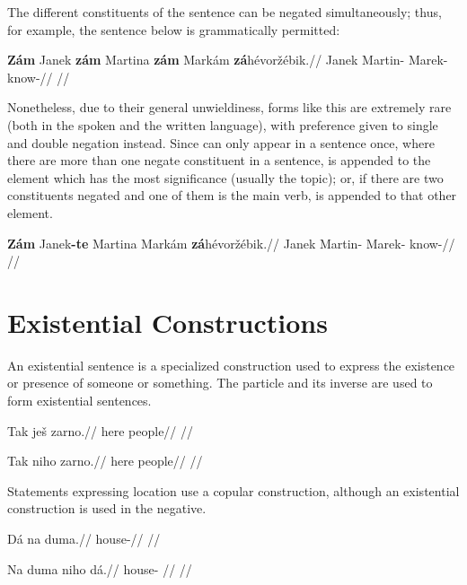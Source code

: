 The different constituents of the sentence can be negated simultaneously; thus,
for example, the sentence below is grammatically permitted:

\pex
\begingl
    \gla \textbf{Z\'am} Janek \textbf{z\'am} Martina \textbf{z\'am} Mark\'am \textbf{z\'a}h\'evor\v{z}\'ebik.//
    \glb {} Janek  Martin-  Marek- know-//
    \glft {}//
\endgl
\xe

Nonetheless, due to their general unwieldiness, forms like this are extremely
rare (both in the spoken and the written language), with preference given to
single and double negation instead. Since  can only appear in a
sentence once, where there are more than one negate constituent in a sentence,
 is appended to the element which has the most significance (usually
the topic); or, if there are two constituents negated and one of them is the
main verb,  is appended to that other element.

\pex
\begingl
    \gla \textbf{Z\'am} Janek\textbf{-te} Martina Mark\'am \textbf{z\'a}h\'evor\v{z}\'ebik.//
    \glb {} Janek Martin- Marek- know-//
    \glft {}//
\endgl
\xe


\section{Existential Constructions}
\label{sec:exst}
An existential sentence is a specialized construction used to express the existence or presence of someone or something. The particle  and its inverse  are used to form existential sentences.

\pex
\begingl
\gla Tak je\v{s} zarno.//
\glb here  people//
\glft {}//
\endgl
\xe

\pex
\begingl
\gla Tak niho zarno.//
\glb here  people//
\glft {}//
\endgl
\xe

Statements expressing location use a copular construction, although an existential construction is used in the negative.

\pex
\begingl
\gla D\'a na duma.//
\glb {}  house-//
\glft {}//
\endgl
\xe

\pex
\begingl
\gla Na duma niho d\'a.//
\glb {} house-  //
\glft {}//
\endgl
\xe

